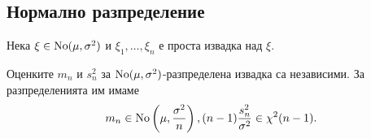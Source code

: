 \documentclass[numbers=endperiod, bibliography=totocnumbered]{scrartcl}
\begin{document}
\subsection{Нормално разпределение}

Нека \( \xi \in \operatorname{No}(\mu, \sigma^2) \) и \( \xi_1, \ldots, \xi_n \) е проста извадка над \( \xi \).

\begin{proposition}\label{thm:normal_mean_variance_estimators_independent}
  Оценките \( m_n \) и \( s_n^2 \) за \( \operatorname{No}(\mu, \sigma^2) \)-разпределена извадка са независими. За разпределенията им имаме
  \begin{equation*}
    m_n \in \operatorname{No} \left(\mu, \frac {\sigma^2} n \right),
    \\
    (n-1) \frac {s_n^2} {\sigma^2} \in \chi^2(n-1).
  \end{equation*}
\end{proposition}
\end{document}
